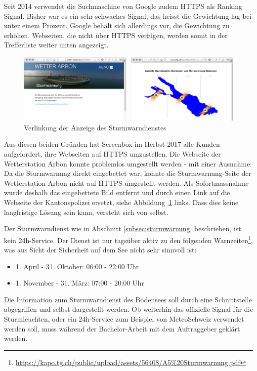 Seit 2014 verwendet die Suchmaschine von Google zudem HTTPS als Ranking Signal. Bisher war es ein sehr schwaches Signal, das heisst die Gewichtung lag bei unter einem Prozent. Google behält sich allerdings vor, die Gewichtung zu erhöhen\cite{Googleblog:https-as-ranking-signal}. Webseiten, die nicht über HTTPS verfügen, werden somit in der Trefferliste weiter unten angezeigt.

\begin{figure}[h!]
	\centering
	\includegraphics[width=1\linewidth]{img/sturm}
	\caption{Verlinkung der Anzeige des Sturmwarndienstes}
	\label{img:sturm}
\end{figure}

Aus diesen beiden Gründen hat Screenbox im Herbst 2017 alle Kunden aufgefordert, ihre Webseiten auf HTTPS umzustellen. Die Webseite der Wetterstation Arbon konnte problemlos umgestellt werden - mit einer Ausnahme: Da die Sturmwarnung direkt eingebettet war, konnte die Sturmwarnung-Seite der Wetterstation Arbon nicht auf HTTPS umgestellt werden. Als Sofortmassnahme wurde deshalb das eingebettete Bild entfernt und durch einen Link auf die Webseite der Kantonspolizei ersetzt, siehe Abbildung~\ref{img:sturm} links. Dass dies keine langfristige Lösung sein kann, versteht sich von selbst.

Der Sturmwarndienst wie in Abschnitt \ref{subsec:sturmwarnung} beschrieben, ist kein 24h-Service. Der Dienst ist nur tagsüber aktiv zu den folgenden Warnzeiten\footnote{ \url{https://kapo.tg.ch/public/upload/assets/56408/A5\%20Sturmwarnung.pdf}}, was aus Sicht der Sicherheit auf dem See nicht sehr sinnvoll ist:

\begin{itemize}  
\item 1. April - 31. Oktober: 06:00 - 22:00 Uhr 
\item 1. November - 31. März: 07:00 - 20:00 Uhr
\end{itemize}

\noindent
Die Information zum Sturmwarndienst des Bodensees soll durch eine Schnittstelle abgegriffen und selbst dargestellt werden. Ob weiterhin das offizielle Signal für die Sturmleuchten, oder ein 24h-Service zum Beispiel von MeteoSchweiz verwendet werden soll, muss während der Bachelor-Arbeit mit dem Auftraggeber geklärt werden.



